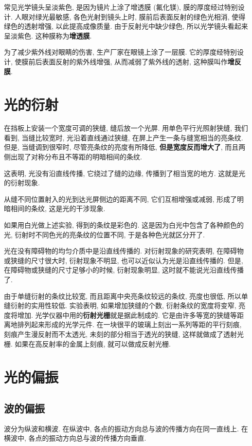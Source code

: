 \documentclass[UTF8,openany,fontset=fandol]{ctexbook}
\theoremstyle{chinesetextbook}
\begin{document}
常见光学镜头呈淡紫色, 是因为镜片上涂了增透膜 (氟化镁), 膜的厚度经过特别设计. 人眼对绿光最敏感, 各色光射到镜头上时, 膜前后表面反射的绿色光相消, 使得绿色的透射增强, 以此提高成像质量. 由于反射光中缺少绿色, 所以光学镜头看起来呈淡紫色. 这种膜称为\textbf{增透膜}.

为了减少紫外线对眼睛的伤害, 生产厂家在眼镜上涂了一层膜. 它的厚度经特别设计, 使膜前后表面反射的紫外线增强, 从而减弱了紫外线的透射, 这种膜叫作\textbf{增反膜}.
\section{光的衍射}
在挡板上安装一个宽度可调的狭缝, 缝后放一个光屏. 用单色平行光照射狭缝, 我们看到, 当缝比较宽时, 光沿着直线通过狭缝, 在屏上产生一条与缝宽相当的亮条纹. 但是, 当缝调到很窄时, 尽管亮条纹的亮度有所降低, \textbf{但是宽度反而增大了}, 而且两侧出现了对称分布且不等距的明暗相间的条纹.

这表明, 光没有沿直线传播, 它绕过了缝的边缘, 传播到了相当宽的地方. 这就是光的衍射现象.

从缝不同位置射入的光到达光屏侧边的距离不同, 它们互相增强或减弱, 形成了明暗相间的条纹, 这是光的干涉现象.

如果用白光做上述实验, 得到的条纹是彩色的. 这是因为白光中包含了各种颜色的光, 衍射时不同色光的亮条纹的位置不同, 于是各种色光就区分开了.

光在没有障碍物的均匀介质中是沿直线传播的. 对衍射现象的研究表明, 在障碍物或狭缝的尺寸很大时, 衍射现象不明显, 也可以近似认为光是沿直线传播的. 但是, 在障碍物或狭缝的尺寸足够小的时候, 衍射现象明显, 这时就不能说光沿直线传播了.

由于单缝衍射的条纹比较宽, 而且距离中央亮条纹较远的条纹, 亮度也很低, 所以单缝衍射的实用性较低. 实验表明, 如果增加狭缝的个数, 衍射条纹的宽度将变窄, 亮度将增加. 光学仪器中用的\textbf{衍射光栅}就是据此制成的. 它是由许多等宽的狭缝等距离地排列起来形成的光学元件. 在一块很平的玻璃上刻出一系列等距的平行刻痕, 刻痕产生漫反射而不太透光, 未刻的部分相当于透光的狭缝, 这样就做成了透射光栅. 如果在高反射率的金属上刻痕, 就可以做成反射光栅.
\section{光的偏振}
\subsection{波的偏振}
波分为纵波和横波. 在纵波中, 各点的振动方向总与波的传播方向在同一直线上. 在横波中, 各点的振动方向总与波的传播方向垂直.
\end{document}
